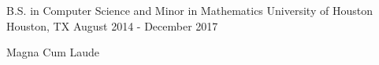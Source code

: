 

\begin{cventries}

  \cventry
    {B.S. in Computer Science and Minor in Mathematics} %
    {University of Houston} %
    {Houston, TX} %
    {August 2014 - December 2017} %
    {
      \begin{cvitems} %
        \item {Magna Cum Laude}
      \end{cvitems}
    }

\end{cventries}
